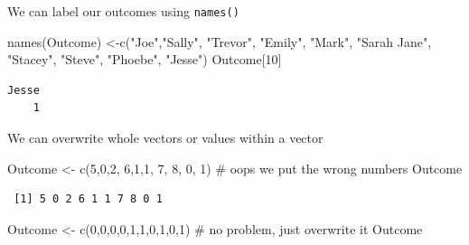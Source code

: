 \documentclass[
  letterpaper,
  DIV=11,
  numbers=noendperiod]{scrreprt}
\newenvironment{Shaded}{\begin{snugshade}}{\end{snugshade}}
\newcommand{\CommentTok}[1]{\textcolor[rgb]{0.37,0.37,0.37}{#1}}
\newcommand{\DecValTok}[1]{\textcolor[rgb]{0.68,0.00,0.00}{#1}}
\newcommand{\FunctionTok}[1]{\textcolor[rgb]{0.28,0.35,0.67}{#1}}
\newcommand{\NormalTok}[1]{\textcolor[rgb]{0.00,0.23,0.31}{#1}}
\newcommand{\OtherTok}[1]{\textcolor[rgb]{0.00,0.23,0.31}{#1}}
\newcommand{\StringTok}[1]{\textcolor[rgb]{0.13,0.47,0.30}{#1}}
\begin{document}
We can label our outcomes using \texttt{names()}

\begin{Shaded}
\begin{Highlighting}[]
\FunctionTok{names}\NormalTok{(Outcome) }\OtherTok{\textless{}{-}}\FunctionTok{c}\NormalTok{(}\StringTok{"Joe"}\NormalTok{,}\StringTok{"Sally"}\NormalTok{, }\StringTok{"Trevor"}\NormalTok{, }\StringTok{"Emily"}\NormalTok{, }\StringTok{"Mark"}\NormalTok{,}
                   \StringTok{"Sarah Jane"}\NormalTok{, }\StringTok{"Stacey"}\NormalTok{, }\StringTok{"Steve"}\NormalTok{, }\StringTok{"Phoebe"}\NormalTok{, }\StringTok{"Jesse"}\NormalTok{)}
\NormalTok{Outcome[}\DecValTok{10}\NormalTok{]}
\end{Highlighting}
\end{Shaded}

\begin{verbatim}
Jesse 
    1 
\end{verbatim}

We can overwrite whole vectors or values within a vector

\begin{Shaded}
\begin{Highlighting}[]
\NormalTok{Outcome }\OtherTok{\textless{}{-}} \FunctionTok{c}\NormalTok{(}\DecValTok{5}\NormalTok{,}\DecValTok{0}\NormalTok{,}\DecValTok{2}\NormalTok{, }\DecValTok{6}\NormalTok{,}\DecValTok{1}\NormalTok{,}\DecValTok{1}\NormalTok{, }\DecValTok{7}\NormalTok{, }\DecValTok{8}\NormalTok{, }\DecValTok{0}\NormalTok{, }\DecValTok{1}\NormalTok{) }\CommentTok{\# oops we put the wrong numbers}
\NormalTok{Outcome}
\end{Highlighting}
\end{Shaded}

\begin{verbatim}
 [1] 5 0 2 6 1 1 7 8 0 1
\end{verbatim}

\begin{Shaded}
\begin{Highlighting}[]
\NormalTok{Outcome }\OtherTok{\textless{}{-}} \FunctionTok{c}\NormalTok{(}\DecValTok{0}\NormalTok{,}\DecValTok{0}\NormalTok{,}\DecValTok{0}\NormalTok{,}\DecValTok{0}\NormalTok{,}\DecValTok{1}\NormalTok{,}\DecValTok{1}\NormalTok{,}\DecValTok{0}\NormalTok{,}\DecValTok{1}\NormalTok{,}\DecValTok{0}\NormalTok{,}\DecValTok{1}\NormalTok{) }\CommentTok{\# no problem, just overwrite it}
\NormalTok{Outcome}
\end{Highlighting}
\end{Shaded}
\end{document}

